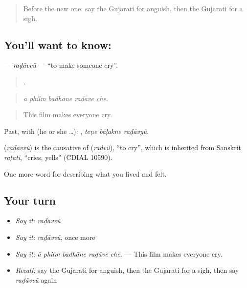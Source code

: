 \label{lesson:GU-C455-radavvu}



\begin{quote}
Before the new one: say the Gujarati for anguish, then the Gujarati for a sigh.
\end{quote}

\subsection*{You'll want to know: }
\textbf{} — \emph{raḍāvvũ} — \textquotedblleft{}to make someone cry\textquotedblright{}.

\begin{quote}
    .
\end{quote}

\begin{quote}
\emph{ā philm badhāne raḍāve che.}
\end{quote}

\begin{quote}
This film makes everyone cry.
\end{quote}

Past, with  (he or she …):   , \emph{teṇe bāḷakne raḍāvyũ}.

\begin{cousinweb}
\textbf{} (\emph{raḍāvvũ}) is the causative of \textbf{} (\emph{raḍvũ}), \textquotedblleft{}to cry\textquotedblright{}, which is inherited from Sanskrit \emph{raṭati}, \textquotedblleft{}cries, yells\textquotedblright{} (CDIAL 10590).
\end{cousinweb}

\begin{grammarlens}[title={What you've built}]
One more word for describing what you lived and felt.
\end{grammarlens}

\subsection*{Your turn}
\begin{itemize}
\raggedright
  \item \emph{Say it:} \emph{raḍāvvũ}
  \item \emph{Say it:} \emph{raḍāvvũ}, once more
  \item \emph{Say it:} \emph{ā philm badhāne raḍāve che.} — This film makes everyone cry.
  \item \emph{Recall:} say the Gujarati for anguish, then the Gujarati for a sigh, then say \emph{raḍāvvũ} again
\end{itemize}

